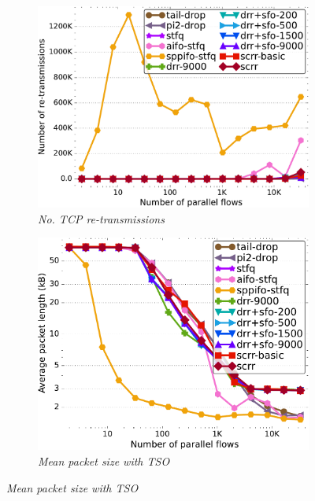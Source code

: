 \begin{figure}[t]
	\centering
 	\begin{subfigure}[t]{.49\linewidth}
		\centering
                \includegraphics[width=1\linewidth]{figs/paral_cn_1t16x1024_spifo_retr_comp_methods.pdf}
                \caption{\small{\textit{No. TCP re-transmissions}}}
	        \label{fig:sppifo-retr}
	\end{subfigure}
	\begin{subfigure}[t]{.49\linewidth}
		\centering
                \includegraphics[width=1\linewidth]{figs/paral_cn_1t16x1024_spifo_skblen_comp_methods.pdf}
                \caption{\small{\textit{Mean packet size with TSO}}}
	        \label{fig:sppifo-skbl}
	\end{subfigure}


\end{figure}
